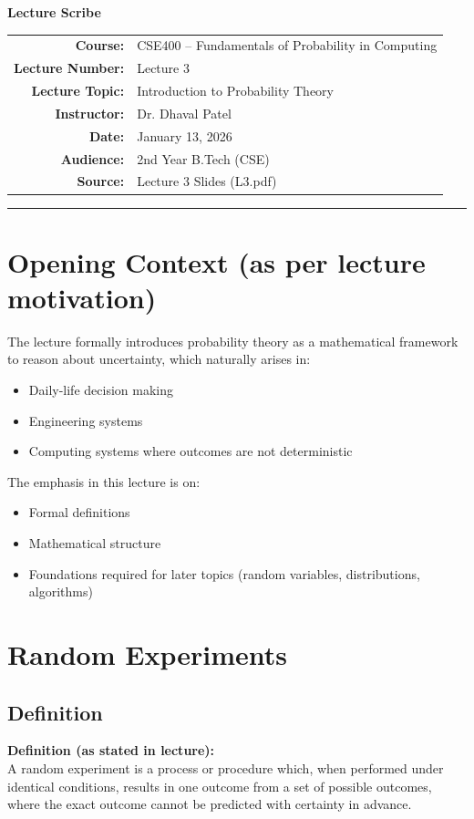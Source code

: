 \documentclass[11pt]{article}
\begin{document}
\begin{center}
    {\Large \textbf{Lecture Scribe}} \\
    \vspace{0.3cm}
    \begin{tabular}{rl}
        \textbf{Course:} & CSE400 – Fundamentals of Probability in Computing \\
        \textbf{Lecture Number:} & Lecture 3 \\
        \textbf{Lecture Topic:} & Introduction to Probability Theory \\
        \textbf{Instructor:} & Dr. Dhaval Patel \\
        \textbf{Date:} & January 13, 2026 \\
        \textbf{Audience:} & 2nd Year B.Tech (CSE) \\
        \textbf{Source:} & Lecture 3 Slides (L3.pdf)
    \end{tabular}
\end{center}
\hrule
\vspace{0.5cm}


\section{Opening Context (as per lecture motivation)}
The lecture formally introduces probability theory as a mathematical framework to reason about uncertainty, which naturally arises in:
\begin{itemize}
    \item Daily-life decision making
    \item Engineering systems
    \item Computing systems where outcomes are not deterministic
\end{itemize}
The emphasis in this lecture is on:
\begin{itemize}
    \item Formal definitions
    \item Mathematical structure
    \item Foundations required for later topics (random variables, distributions, algorithms)
\end{itemize}

\section{Random Experiments}

\subsection{Definition}
\textbf{Definition (as stated in lecture):} \\
A random experiment is a process or procedure which, when performed under identical conditions, results in one outcome from a set of possible outcomes, where the exact outcome cannot be predicted with certainty in advance.
\end{document}
